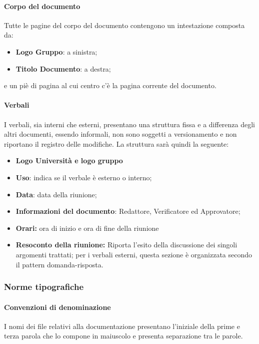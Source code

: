 		\paragraph*{Corpo del documento}      
		\aCapo{}   
			Tutte le pagine del corpo del documento contengono un intestazione composta da:
				\begin{itemize}
					\item \textbf{Logo Gruppo}: a sinistra;
					\item \textbf{Titolo Documento}: a destra;
				\end{itemize}
			e un piè di pagina al cui centro c'è la pagina corrente del documento.
			
		\paragraph*{Verbali} %
		\aCapo{}  
			I verbali, sia interni che esterni, presentano una struttura fissa e a differenza degli altri documenti, essendo informali, non sono soggetti a versionamento e non riportano il registro delle modifiche.
			La struttura sarà quindi la seguente:
				\begin{itemize}
					\item \textbf{Logo Università e logo gruppo}
					\item \textbf{Uso}: indica se il verbale è esterno o interno;
					\item \textbf{Data}: data della riunione;
					\item \textbf{Informazioni del documento}: Redattore, Verificatore ed Approvatore;
					\item \textbf{Orari:} ora di inizio e ora di fine della riunione
					\item \textbf{Resoconto della riunione:} Riporta l'esito della discussione dei singoli argomenti trattati; per i verbali esterni, questa sezione è organizzata secondo il pattern domanda-risposta.								
				\end{itemize}
	
	\subsubsection{Norme tipografiche}
		\paragraph*{Convenzioni di denominazione}   %
		\aCapo{}  
			I nomi dei file relativi alla documentazione presentano l'iniziale della prime e terza parola che lo compone in maiuscolo e presenta separazione tra le parole. 
